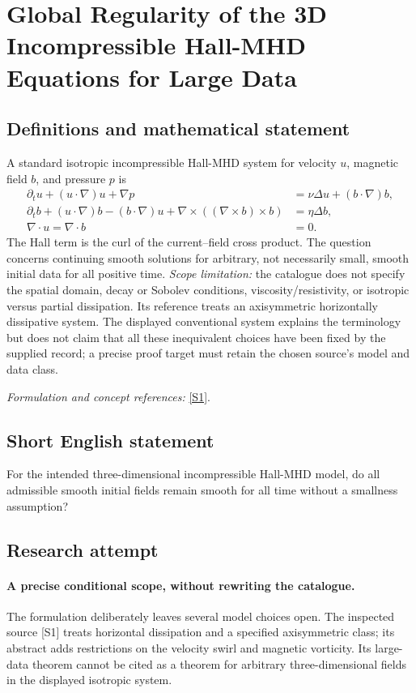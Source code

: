 \documentclass[11pt]{article}
\begin{document}
\section*{\texorpdfstring{Global Regularity of the 3D Incompressible Hall-MHD Equations for Large Data}{Global Regularity of the 3D Incompressible Hall-MHD Equations for Large Data}}\label{30006900}
\subsection{Definitions and mathematical statement}
A standard isotropic incompressible Hall-MHD system for velocity $u$, magnetic field $b$, and pressure $p$ is
\[
 \begin{aligned}
 \partial_tu+(u\cdot\nabla)u+\nabla p&=\nu\Delta u+(b\cdot\nabla)b,\\
 \partial_tb+(u\cdot\nabla)b-(b\cdot\nabla)u
   +\nabla\times((\nabla\times b)\times b)&=\eta\Delta b,\\
 \nabla\cdot u=\nabla\cdot b&=0.
 \end{aligned}
\]
The Hall term is the curl of the current--field cross product. The question concerns continuing smooth solutions for arbitrary, not necessarily small, smooth initial data for all positive time. \emph{Scope limitation:} the catalogue does not specify the spatial domain, decay or Sobolev conditions, viscosity/resistivity, or isotropic versus partial dissipation. Its reference treats an axisymmetric horizontally dissipative system. The displayed conventional system explains the terminology but does not claim that all these inequivalent choices have been fixed by the supplied record; a precise proof target must retain the chosen source's model and data class.
\par\smallskip\textit{Formulation and concept references:} \href{https://link.springer.com/article/10.1007/s44198-022-00063-8}{[S1]}.

\subsection{Short English statement}
For the intended three-dimensional incompressible Hall-MHD model, do all admissible smooth initial fields remain smooth for all time without a smallness assumption?
\subsection{Research attempt}
\paragraph{A precise conditional scope, without rewriting the catalogue.}
The formulation deliberately leaves several model choices open.
The inspected source [S1] treats horizontal dissipation and a
specified axisymmetric class; its abstract adds restrictions on
the velocity swirl and magnetic vorticity. Its large-data theorem
cannot be cited as a theorem for arbitrary three-dimensional
fields in the displayed isotropic system.
\end{document}
